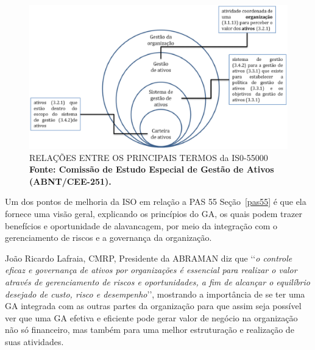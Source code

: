 \graphicspath{{figuras/}}
\begin{figure}[H]
\centering
\includegraphics[width=1.0\textwidth]{termos_iso_55000.eps}
\caption{RELAÇÕES ENTRE OS PRINCIPAIS TERMOS da IS0-55000 \textbf{Fonte: Comissão de Estudo Especial de
Gestão de Ativos (ABNT/CEE-251).}}
\label{termos_iso_55000}
\end{figure}

Um dos pontos de melhoria da ISO em relação a PAS 55 Seção~\ref{pas55} é que ela fornece uma visão geral, explicando os princípios do GA, os quais podem trazer benefícios e oportunidade de alavancagem, por meio da integração com o gerenciamento de riscos e a governança da organização. 

João Ricardo Lafraia, CMRP, Presidente da ABRAMAN diz que \lq\lq \emph{o controle eficaz e governança de ativos por organizações é essencial para realizar o valor através de gerenciamento de riscos e oportunidades, a fim de alcançar o equilíbrio desejado de custo, risco e desempenho}\rq\rq, mostrando a importância de se ter uma GA integrada com as outras partes da organização para que assim seja possível ver que uma GA efetiva e eficiente pode gerar valor de negócio na organização não só financeiro, mas também para uma melhor estruturação e realização de suas atividades. 


